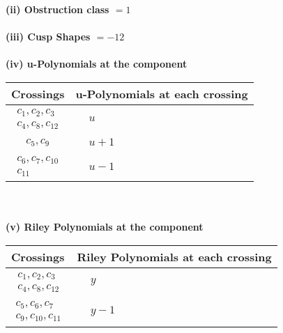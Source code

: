 \documentclass[1p]{elsarticle_modified}
\theoremstyle{definition}
\begin{document}
\flushleft \textbf{(ii) Obstruction class $= 1$}\\~\\
\flushleft \textbf{(iii) Cusp Shapes $= -12$}\\~\\
\newpage\renewcommand{\arraystretch}{1}
\flushleft \textbf{(iv) u-Polynomials at the component}\newline \\
\begin{tabular}{m{50pt}|m{274pt}}
Crossings & \hspace{64pt}u-Polynomials at each crossing \\
\hline $$\begin{aligned}c_{1},c_{2},c_{3}\\c_{4},c_{8},c_{12}\end{aligned}$$&$\begin{aligned}
&u
\end{aligned}$\\
\hline $$\begin{aligned}c_{5},c_{9}\end{aligned}$$&$\begin{aligned}
&u+1
\end{aligned}$\\
\hline $$\begin{aligned}c_{6},c_{7},c_{10}\\c_{11}\end{aligned}$$&$\begin{aligned}
&u-1
\end{aligned}$\\
\hline
\end{tabular}\\~\\
\newpage\renewcommand{\arraystretch}{1}
\flushleft \textbf{(v) Riley Polynomials at the component}\newline \\
\begin{tabular}{m{50pt}|m{274pt}}
Crossings & \hspace{64pt}Riley Polynomials at each crossing \\
\hline $$\begin{aligned}c_{1},c_{2},c_{3}\\c_{4},c_{8},c_{12}\end{aligned}$$&$\begin{aligned}
&y
\end{aligned}$\\
\hline $$\begin{aligned}c_{5},c_{6},c_{7}\\c_{9},c_{10},c_{11}\end{aligned}$$&$\begin{aligned}
&y-1
\end{aligned}$\\
\hline
\end{tabular}\\~\\
\end{document}
